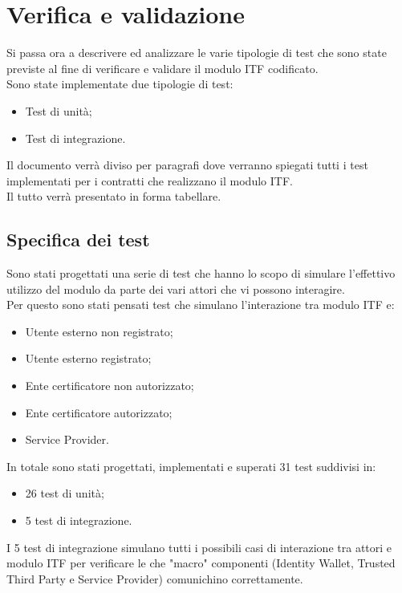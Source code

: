 
\chapter{Verifica e validazione}
\label{cap:verifica_validazione}
Si passa ora a descrivere ed analizzare le varie tipologie di test che sono state previste al fine di verificare e validare il modulo \gls{ITF} codificato.\\
Sono state implementate due tipologie di test:
\begin{itemize}
	\item Test di unità;
	\item Test di integrazione.
\end{itemize}
Il documento verrà diviso per paragrafi dove verranno spiegati tutti i test implementati per i contratti che realizzano il modulo \gls{ITF}.\\
Il tutto verrà presentato in forma tabellare.
\section{Specifica dei test}
Sono stati progettati una serie di test che hanno lo scopo di simulare l'effettivo utilizzo del modulo da parte dei vari attori che vi possono interagire.\\
Per questo sono stati pensati test che simulano l'interazione tra modulo \gls{ITF} e:
\begin{itemize}
	\item Utente esterno non registrato;
	\item Utente esterno registrato;
	\item Ente certificatore non autorizzato;
	\item Ente certificatore autorizzato;
	\item Service Provider.
\end{itemize}
In totale sono stati progettati, implementati e superati 31 test suddivisi in:
\begin{itemize}
	\item 26 test di unità;
	\item 5 test di integrazione.
\end{itemize}
I 5 test di integrazione simulano tutti i possibili casi di interazione tra attori e modulo \gls{ITF} per verificare le che "macro" componenti (Identity Wallet, Trusted Third Party e Service Provider) comunichino correttamente.

